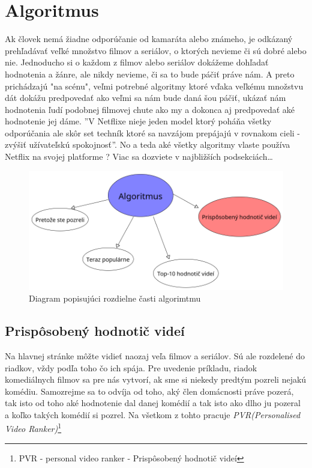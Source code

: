 \documentclass[10pt,twoside,slovak,a4paper]{article}
\begin{document}
\section{Algoritmus} \label{Algoritmus}
Ak človek nemá žiadne odporúčanie od kamaráta alebo známeho, je odkázaný prehľadávať veľké množstvo filmov a seriálov, o ktorých nevieme či sú dobré alebo nie. Jednoducho si o každom z filmov alebo seriálov dokážeme dohľadať hodnotenia a žánre, ale nikdy nevieme, či sa to bude páčiť práve nám. A preto prichádzajú "na scénu", veľmi potrebné algoritmy ktoré vďaka veľkému množstvu dát dokážu predpovedať ako veľmi sa nám bude daná šou páčiť, ukázať nám hodnotenia ľudí podobnej filmovej chute ako my a dokonca aj predpovedať aké hodnotenie jej dáme. ''V Netflixe nieje jeden model ktorý poháňa všetky odporúčania ale skôr set techník ktoré sa navzájom prepájajú v rovnakom cieli - zvýšiť užívateľskú spokojnosť''\cite{Steck_Baltrunas_Elahi_Liang_Raimond_Basilico_2021}. No a teda aké všetky algoritmy vlaste používa Netflix na svojej platforme ? Viac sa dozviete v najbližších podsekciách\ldots
\begin{figure}
	\begin{center}
		\includegraphics[scale=.4]{DiagramAlgoritmus.png}
		\caption{Diagram popisujúci rozdielne časti algorimtmu}
	\end{center}
\end{figure}

\subsection{Prispôsobený hodnotič videí}
Na hlavnej stránke môžte vidieť naozaj veľa filmov a seriálov. Sú ale rozdelené do riadkov, vždy podľa toho čo ich spája. Pre uvedenie príkladu, riadok komediálnych filmov sa pre nás vytvorí, ak sme si niekedy predtým pozreli nejakú komédiu. Samozrejme sa to odvíja od toho, aký člen domácnosti práve pozerá, tak isto od toho aké hodnotenie dal danej komédií a tak isto ako dlho ju pozeral a koľko takých komédií si pozrel. Na všetkom z tohto pracuje \textit{PVR(Personalised Video Ranker)}\footnote{PVR - personal video ranker - Prispôsobený hodnotič videí\cite{10.1145/2843948}}\cite{10.1145/2843948}
\end{document}
